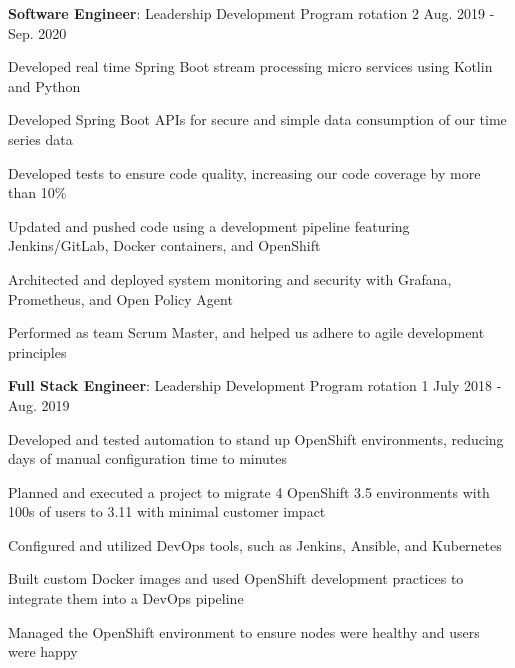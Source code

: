 \begin{cventries}

\vspace{-1.25em}
\cventry
{\textbf{Software Engineer}: Leadership Development Program rotation 2} %
{} %
{} %
{Aug. 2019 - Sep. 2020} %
{ %
\begin{cvitems}
\item {Developed real time Spring Boot stream processing micro services using Kotlin and Python}
\item {Developed Spring Boot APIs for secure and simple data consumption of our time series data}
\item {Developed tests to ensure code quality, increasing our code coverage by more than 10\%}
\item {Updated and pushed code using a development pipeline featuring Jenkins/GitLab, Docker containers, and OpenShift}
\item {Architected and deployed system monitoring and security with Grafana, Prometheus, and Open Policy Agent}
\item {Performed as team Scrum Master, and helped us adhere to agile development principles}
\end{cvitems}
}


\vspace{-1.25em}
\cventry
{\textbf{Full Stack Engineer}: Leadership Development Program rotation 1} %
{} %
{} %
{July 2018 - Aug. 2019} %
{ %
\begin{cvitems}
\item {Developed and tested automation to stand up OpenShift environments, reducing days of manual configuration time to minutes}
\item {Planned and executed a project to migrate 4 OpenShift 3.5 environments with 100s of users to 3.11 with minimal customer impact}
\item {Configured and utilized DevOps tools, such as Jenkins, Ansible, and Kubernetes}
\item {Built custom Docker images and used OpenShift development practices to integrate them into a DevOps pipeline}
\item {Managed the OpenShift environment to ensure nodes were healthy and users were happy}
\end{cvitems}
}


\end{cventries}
